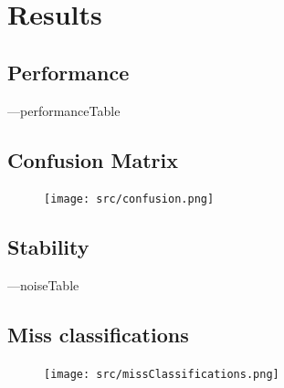 \documentclass[12pt]{article}
\begin{document}
\section{Results}
\subsection{Performance}
---performanceTable
\subsection{Confusion Matrix}
\begin{figure}[H]
    \centering
    \texttt{[image: src/confusion.png]}
\end{figure}
\subsection{Stability}
\begin{table}[H]
    ---noiseTable
\end{table}

\subsection{Miss classifications}
\begin{figure}[H]
    \centering
    \texttt{[image: src/missClassifications.png]}
\end{figure}
\end{document}
